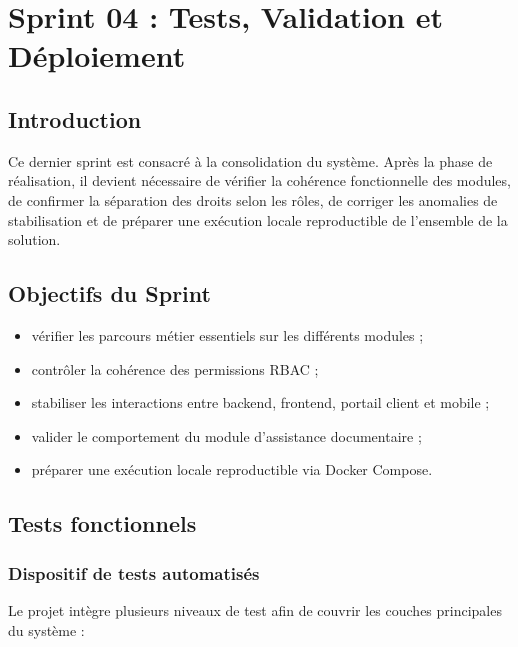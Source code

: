 \chapter{Sprint 04 : Tests, Validation et Déploiement}
\minitoc
\newpage

\section{Introduction}
Ce dernier sprint est consacré à la consolidation du système. Après la phase de réalisation, il devient nécessaire de vérifier la cohérence fonctionnelle des modules, de confirmer la séparation des droits selon les rôles, de corriger les anomalies de stabilisation et de préparer une exécution locale reproductible de l'ensemble de la solution.

\section{Objectifs du Sprint}
\begin{itemize}
    \item vérifier les parcours métier essentiels sur les différents modules ;
    \item contrôler la cohérence des permissions RBAC ;
    \item stabiliser les interactions entre backend, frontend, portail client et mobile ;
    \item valider le comportement du module d'assistance documentaire ;
    \item préparer une exécution locale reproductible via Docker Compose.
\end{itemize}

\section{Tests fonctionnels}

\subsection{Dispositif de tests automatisés}
Le projet intègre plusieurs niveaux de test afin de couvrir les couches principales du système :

